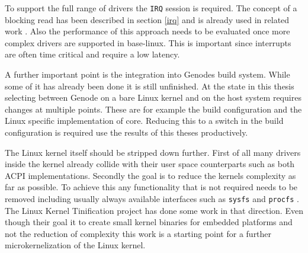 \documentclass[
a4paper,
12pt,
notitlepage,
parskip=half,
DIV=11,
]{scrbook}
\begin{document}
		To support the full range of drivers the \texttt{IRQ} session is required.
		The concept of a blocking read has been described in section \ref{irq} and is already used in related work \citep{uio}.
		Also the performance of this approach needs to be evaluated once more complex drivers are supported in base-linux.
		This is important since interrupts are often time critical and require a low latency.
		
		A further important point is the integration into Genodes build system.
		While some of it has already been done it is still unfinished.
		At the state in this thesis selecting between Genode on a bare Linux kernel and on the host system requires changes at multiple points.
		These are for example the build configuration and the Linux specific implementation of core.
		Reducing this to a switch in the build configuration is required use the results of this theses productively.
		
		The Linux kernel itself should be stripped down further.
		First of all many drivers inside the kernel already collide with their user space counterparts such as both ACPI implementations.
		Secondly the goal is to reduce the kernels complexity as far as possible.
		To achieve this any functionality that is not required needs to be removed including usually always available interfaces such as \texttt{sysfs} \citep{sysfs} and \texttt{procfs} \citep{procfs}.
		The Linux Kernel Tinification project \citep{tiny} has done some work in that direction.
		Even though their goal it to create small kernel binaries for embedded platforms and not the reduction of complexity this work is a starting point for a further microkernelization of the Linux kernel.
	
	
	
	
\end{document}
